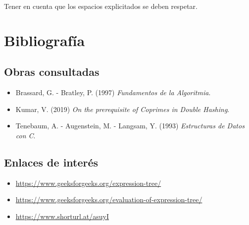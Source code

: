 \documentclass[11pt]{article}
\begin{document}
Tener en cuenta que los espacios explicitados se deben respetar. 

\section{Bibliograf\'ia}

\subsection{Obras consultadas}
\begin{itemize}
    \item Brassard, G. - Bratley, P. (1997) \emph{Fundamentos de la Algoritmia}.
    \item Kumar, V. (2019) \emph{On the prerequisite of Coprimes in Double Hashing}.
    \item Tenebaum, A. - Augenstein, M. - Langsam, Y. (1993) \emph{Estructuras de Datos con C}.
\end{itemize}

\subsection{Enlaces de inter\'es}
\begin{itemize}
    \item \href{https://www.geeksforgeeks.org/expression-tree/}{https://www.geeksforgeeks.org/expression-tree/}
    \item \href{https://www.geeksforgeeks.org/evaluation-of-expression-tree/}{https://www.geeksforgeeks.org/evaluation-of-expression-tree/}
    \item \href{https://www.shorturl.at/asuyI}{https://www.shorturl.at/asuyI}
\end{itemize}
\end{document}
